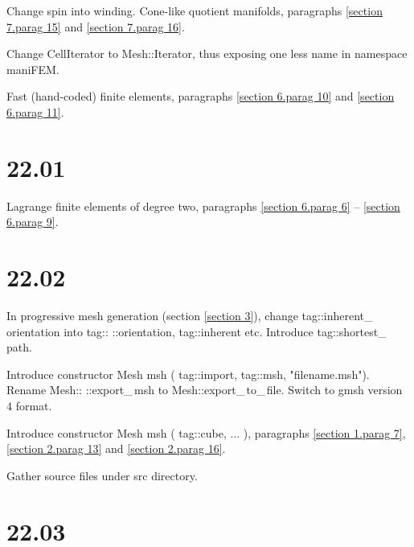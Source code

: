\documentclass[a4paper]{scrreprt}
\def\numb{}
\newcommand\azul[1]{\textcolor{nova}{#1}}
\newcommand\verm[1]{\textcolor{manif}{#1}}
\newcommand\verde[1]{\textcolor{string}{#1}}
\renewcommand\tt{\normalfont\ttfamily}
\begin{document}
\noindent Change {\small\tt spin} into {\small\tt winding}.
Cone-like quotient manifolds, paragraphs \ref{\numb section 7.\numb parag 15} and
\ref{\numb section 7.\numb parag 16}.

\noindent Change {\small\tt\verm{CellIterator}} to {\small\tt\verm{Mesh}::Iterator},
thus exposing one less name in {\small\tt namespace \verm{maniFEM}}.

\noindent Fast (hand-coded) finite elements, paragraphs \ref{\numb section 6.\numb parag 10}
and \ref{\numb section 6.\numb parag 11}.


\section*{22.01}

\noindent Lagrange finite elements of degree two, paragraphs \ref{\numb section 6.\numb parag 6}
-- \ref{\numb section 6.\numb parag 9}.


\section*{22.02}

\noindent In progressive mesh generation (section \ref{\numb section 3}), change
{\small\tt\textcolor{tag}{tag}::inherent\_\,orientation} into
{\small\tt\textcolor{tag}{tag}::} {\small\tt::orientation,} {\small\tt\textcolor{tag}{tag}::inherent} etc.
Introduce {\small\tt\textcolor{tag}{tag}::shortest\_\,path}.

\noindent Introduce constructor {\small\tt\verm{Mesh}} {\small\tt \azul{msh}} {\small\tt (}
{\small\tt\textcolor{tag}{tag}::import,} {\small\tt \textcolor{tag}{tag}::msh,}
{\small\tt\verde{"filename.msh"})}.
\noindent Rename {\small\tt\verm{Mesh}::} {\small\tt::export\_\,msh} to
{\small\tt\verm{Mesh}::export\_\,to\_\,file}.
Switch to {\small\tt gmsh} version 4 format.          

\noindent Introduce constructor {\small\tt\verm{Mesh}} {\small\tt \azul{msh}} {\small\tt (}
{\small\tt\textcolor{tag}{tag}::cube,} {\small\tt ...} {\small\tt )}, paragraphs
\ref{\numb section 1.\numb parag 7}, \ref{\numb section 2.\numb parag 13} and
\ref{\numb section 2.\numb parag 16}.

\noindent Gather source files under {\small\tt src} directory.


\section*{22.03}
\end{document}
